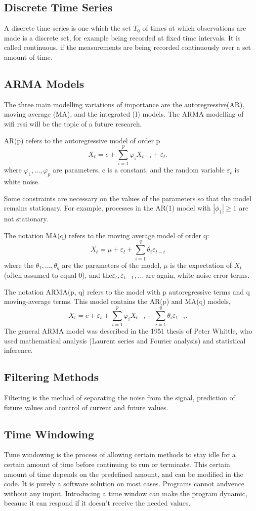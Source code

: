 \subsection{Discrete Time Series}
A discrete time series is one which the set $T_0$ of times at which observations are made is a discrete set, for example being recorded at fixed time intervals. It is called continuous, if the measurements are being recorded continuously over a set amount of time.
\subsection{ARMA Models}
The three main modelling variations of importance are the autoregressive(AR),
moving average (MA), and the integrated (I) models. The ARMA modelling of wifi rssi will be the topic of a future research.


AR(p) refers to the autoregressive model of order p
$$ 
X_t = c + \sum_{i=1}^p \varphi_i X_{t-i}+ \varepsilon_t .\, 
$$
where $\varphi_1, \ldots, \varphi_p$ are parameters, c is a constant, and the random variable $\varepsilon_t$ is white noise.

Some constraints are necessary on the values of the parameters so that the model remains stationary. For example, processes in the AR(1) model with $|\phi_1| \geq 1$ are not stationary.

The notation MA(q) refers to the moving average model of order q:
$$
X_t = \mu + \varepsilon_t + \sum_{i=1}^q \theta_i \varepsilon_{t-i}\,
$$
where the $\theta_1, ..., \theta_q$ are the parameters of the model, $\mu$ is the expectation of $X_t$ (often assumed to equal 0), and the$ \varepsilon_t, \varepsilon_{t-1},...$ are again, white noise error terms.


The notation ARMA(p, q) refers to the model with p autoregressive terms and q moving-average terms. This model contains the AR(p) and MA(q) models,
$$
X_t = c + \varepsilon_t + \sum_{i=1}^p \varphi_i X_{t-i} + \sum_{i=1}^q \theta_i \varepsilon_{t-i}.\,
$$
The general ARMA model was described in the 1951 thesis of Peter Whittle, who used mathematical analysis (Laurent series and Fourier analysis) and statistical inference.


\subsection{Filtering Methods}
Filtering is the method of separating the noise from the signal, prediction of future values and control of current and future values.


\subsection{Time Windowing}
Time windowing is the process of allowing certain methods to stay idle for a certain amount of time before continuing to run or terminate. This certain amount of time depends on the predefined amount, and can be modified in the code. It is purely a software solution on most cases. Programs cannot andvence without any imput. Introducing a time window can make the program dynamic, because it can respond if it doesn't receive the needed values.
